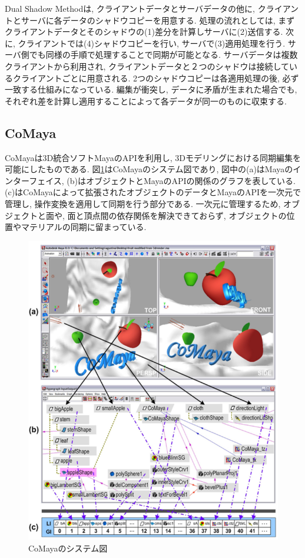 Dual Shadow Methodは, クライアントデータとサーバデータの他に, クライアントとサーバに各データのシャドウコピーを用意する. 処理の流れとしては, まずクライアントデータとそのシャドウの(1)差分を計算しサーバに(2)送信する. 次に, クライアントでは(4)シャドウコピーを行い, サーバで(3)適用処理を行う. サーバ側でも同様の手順で処理することで同期が可能となる. サーバデータは複数クライアントから利用され, クライアントデータと２つのシャドウは接続しているクライアントごとに用意される. 2つのシャドウコピーは各適用処理の後, 必ず一致する仕組みになっている. 編集が衝突し, データに矛盾が生まれた場合でも, それぞれ差を計算し適用することによって各データが同一のものに収束する.
%
\subsection{CoMaya}
CoMayaは3D統合ソフトMayaのAPIを利用し, 3Dモデリングにおける同期編集を可能にしたものである.
図\ref{comayapng}はCoMayaのシステム図であり, 図中の(a)はMayaのインターフェイス, (b)はオブジェクトとMayaのAPIの関係のグラフを表している. (c)はCoMayaによって拡張されたオブジェクトのデータとMayaのAPIを一次元で管理し, 操作変換を適用して同期を行う部分である.
一次元に管理するため, オブジェクトと面や, 面と頂点間の依存関係を解決できておらず, オブジェクトの位置やマテリアルの同期に留まっている.
\begin{figure}[htbp]
  \begin{center}
    \includegraphics[scale=0.6]{images/comaya}
    \caption{CoMayaのシステム図\cite{COMAYA}}
    \label{comayapng}
  \end{center}
\end{figure}
%
